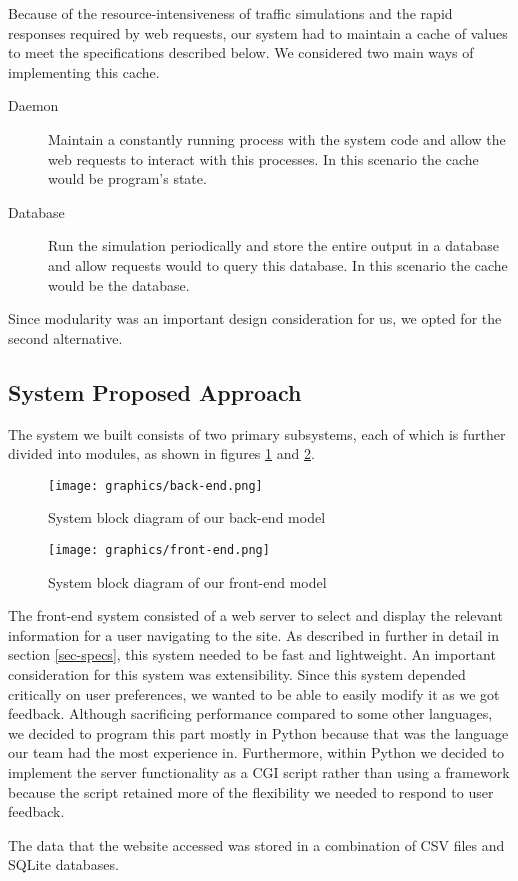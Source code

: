 
Because of the resource-intensiveness of traffic simulations and the
rapid responses required by web requests, our system had to maintain a
cache of values to meet the specifications described below. We
considered two main ways of implementing this cache.

\begin{description}
    \item[Daemon] Maintain a constantly running process with the
  system code and allow the web requests to interact with this
  processes. In this scenario the cache would be program's state.
    \item[Database] Run the simulation periodically and store the
  entire output in a database and allow requests would to query this
  database. In this scenario the cache would be the database.
\end{description}

Since modularity was an important design consideration for us, we
opted for the second alternative.

\subsection{System Proposed Approach}

The system we built consists of two primary subsystems, each of which
is further divided into modules, as shown in figures
\ref{fig-back-end} and \ref{fig-front-end}.

\begin{figure}[htp]
  \centering
  \texttt{[image: graphics/back-end.png]}
  \caption{System block diagram of our back-end model}
  \label{fig-back-end}
\end{figure}

\begin{figure}[htp]
  \centering
  \texttt{[image: graphics/front-end.png]}
  \caption{System block diagram of our front-end model}
  \label{fig-front-end}
\end{figure}

The front-end system consisted of a web server to select and display
the relevant information for a user navigating to the site. As
described in further in detail in section \ref{sec-specs}, this system
needed to be fast and lightweight. An important consideration for this
system was extensibility. Since this system depended critically on
user preferences, we wanted to be able to easily modify it as we got
feedback. Although sacrificing performance compared to some other
languages, we decided to program this part mostly in Python because
that was the language our team had the most experience
in. Furthermore, within Python we decided to implement the server
functionality as a CGI script rather than using a framework because
the script retained more of the flexibility we needed to respond to
user feedback.

The data that the website accessed was stored in a combination of
CSV files and SQLite databases.

